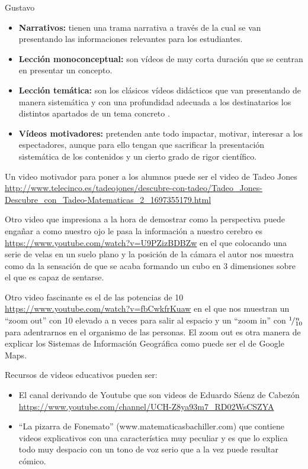 \begin{opin}{\guscolor}{Gustavo}
\begin{leftbar}{\guscolor}
\begin{itemize}
\item \textbf{Narrativos:} tienen una trama narrativa a través de la cual se van presentando las informaciones relevantes para los estudiantes.  

\item \textbf{Lección monoconceptual:} son vídeos de muy corta duración que se centran en presentar un concepto.  

\item \textbf{Lección temática:} son los clásicos vídeos didácticos que van presentando de manera sistemática y con una profundidad adecuada a los destinatarios los distintos apartados de un tema concreto .  

\item \textbf{Vídeos motivadores:} pretenden ante todo impactar, motivar, interesar a los espectadores, aunque para ello tengan que sacrificar la presentación sistemática de los contenidos y un cierto grado de rigor científico. 
\end{itemize}

Un video motivador para poner a los alumnos puede ser el video de Tadeo Jones \url{http://www.telecinco.es/tadeojones/descubre-con-tadeo/Tadeo_Jones-Descubre_con_Tadeo-Matematicas_2_1697355179.html}

Otro video que impresiona a la hora de demostrar como la perspectiva puede engañar a como nuestro ojo le pasa la información a nuestro cerebro es \url{https://www.youtube.com/watch?v=U9PZizBDBZw} en el que colocando una serie de velas en un suelo plano y la posición de la cámara el autor nos muestra como da la sensación de que se acaba formando un cubo en 3 dimensiones sobre el que es capaz de sentarse.

Otro video fascinante es el de las potencias de 10 \url{https://www.youtube.com/watch?v=fbCwkfrKuaw} en el que nos muestran un “zoom out” con 10 elevado a n veces para salir al espacio y un “zoom in” con ${}^{1}\!/_{10}^n$ para adentrarnos en el organismo de las personas. El zoom out es otra manera de explicar los Sistemas de Información Geográfica como puede ser el de Google Maps.

Recursos de videos educativos pueden ser:
\begin{itemize}
\item El canal derivando de Youtube que son videos de Eduardo Sáenz de Cabezón \url{https://www.youtube.com/channel/UCH-Z8ya93m7_RD02WsCSZYA} 

\item “La pizarra de Fonemato” (www.matematicasbachiller.com) que contiene videos explicativos con una característica muy peculiar y es que lo explica todo muy despacio con un tono de voz serio que a la vez puede resultar cómico. 


\end{itemize}
\end{leftbar}
\end{opin}
